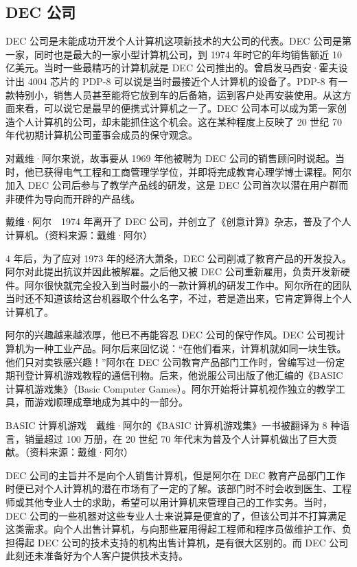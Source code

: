 \documentclass[12pt,UTF8]{ctexbook}
\begin{document}
\subsection{DEC 公司}


DEC 公司是未能成功开发个人计算机这项新技术的大公司的代表。DEC 公司是第一家，同时也是最大的一家小型计算机公司，到 1974 年时它的年均销售额近 10 亿美元。当时一些最精巧的计算机就是 DEC 公司推出的。曾启发马西安·霍夫设计出 4004 芯片的 PDP-8 可以说是当时最接近个人计算机的设备了。PDP-8 有一款特别小，销售人员甚至能将它放到车的后备箱，运到客户处再安装使用。从这方面来看，可以说它是最早的便携式计算机之一了。DEC 公司本可以成为第一家创造个人计算机的公司，却未能抓住这个机会。这在某种程度上反映了 20 世纪 70 年代初期计算机公司董事会成员的保守观念。

对戴维·阿尔来说，故事要从 1969 年他被聘为 DEC 公司的销售顾问时说起。当时，他已获得电气工程和工商管理学学位，并即将完成教育心理学博士课程。阿尔加入 DEC 公司后参与了教学产品线的研发，这是 DEC 公司首次以潜在用户群而非硬件为导向而开辟的产品线。



戴维·阿尔　1974 年离开了 DEC 公司，并创立了《创意计算》杂志，普及了个人计算机。（资料来源：戴维·阿尔）

4 年后，为了应对 1973 年的经济大萧条，DEC 公司削减了教育产品的开发投入。阿尔对此提出抗议并因此被解雇。之后他又被 DEC 公司重新雇用，负责开发新硬件。阿尔很快就完全投入到当时最小的一款计算机的研发工作中。阿尔所在的团队当时还不知道该给这台机器取个什么名字，不过，若是造出来，它肯定算得上个人计算机了。

阿尔的兴趣越来越浓厚，他已不再能容忍 DEC 公司的保守作风。DEC 公司视计算机为一种工业产品。阿尔后来回忆说：“在他们看来，计算机就如同一块生铁。他们只对卖铁感兴趣！”阿尔在 DEC 公司教育产品部门工作时，曾编写过一份定期刊登计算机游戏教程的通信刊物。后来，他说服公司出版了他汇编的《BASIC 计算机游戏集》（Basic Computer Games）。阿尔开始将计算机视作独立的教学工具，而游戏顺理成章地成为其中的一部分。



BASIC 计算机游戏　戴维·阿尔的《BASIC 计算机游戏集》一书被翻译为 8 种语言，销量超过 100 万册，在 20 世纪 70 年代末为普及个人计算机做出了巨大贡献。（资料来源：戴维·阿尔）

DEC 公司的主旨并不是向个人销售计算机，但是阿尔在 DEC 教育产品部门工作时便已对个人计算机的潜在市场有了一定的了解。该部门时不时会收到医生、工程师或其他专业人士的求助，希望可以用计算机来管理自己的工作实务。当时，DEC 公司的一些机器对这些专业人士来说算是便宜的了，但该公司并不打算满足这类需求。向个人出售计算机，与向那些雇用得起工程师和程序员做维护工作、负担得起 DEC 公司的技术支持的机构出售计算机，是有很大区别的。而 DEC 公司此刻还未准备好为个人客户提供技术支持。
\end{document}

